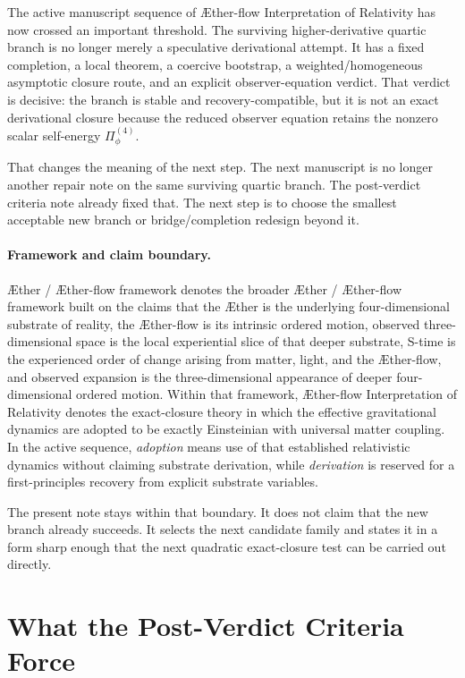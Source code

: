 \documentclass[11pt]{article}
\newcommand{\Aether}{\AE{}ther}
\newcommand{\Aflow}{\AE{}ther-flow}
\newcommand{\TheoryName}{\Aflow{} Interpretation of Relativity}
\newcommand{\TheoryProgram}{\Aether{} / \Aflow{} framework}
\begin{document}
The active manuscript sequence of \TheoryName{} has now crossed an important threshold. The surviving higher-derivative quartic branch is no longer merely a speculative derivational attempt. It has a fixed completion, a local theorem, a coercive bootstrap, a weighted/homogeneous asymptotic closure route, and an explicit observer-equation verdict. That verdict is decisive: the branch is stable and recovery-compatible, but it is not an exact derivational closure because the reduced observer equation retains the nonzero scalar self-energy \(\Pi_\phi^{(4)}\).

That changes the meaning of the next step. The next manuscript is no longer another repair note on the same surviving quartic branch. The post-verdict criteria note already fixed that. The next step is to choose the smallest acceptable new branch or bridge/completion redesign beyond it.

\paragraph{Framework and claim boundary.}
\TheoryProgram{} denotes the broader \Aether{} / \Aflow{} framework built on the claims that the \Aether{} is the underlying four-dimensional substrate of reality, the \Aflow{} is its intrinsic ordered motion, observed three-dimensional space is the local experiential slice of that deeper substrate, S-time is the experienced order of change arising from matter, light, and the \Aflow{}, and observed expansion is the three-dimensional appearance of deeper four-dimensional ordered motion. Within that framework, \TheoryName{} denotes the exact-closure theory in which the effective gravitational dynamics are adopted to be exactly Einsteinian with universal matter coupling. In the active sequence, \emph{adoption} means use of that established relativistic dynamics without claiming substrate derivation, while \emph{derivation} is reserved for a first-principles recovery from explicit substrate variables.

The present note stays within that boundary. It does not claim that the new branch already succeeds. It selects the next candidate family and states it in a form sharp enough that the next quadratic exact-closure test can be carried out directly.

\section{What the Post-Verdict Criteria Force}
\end{document}
